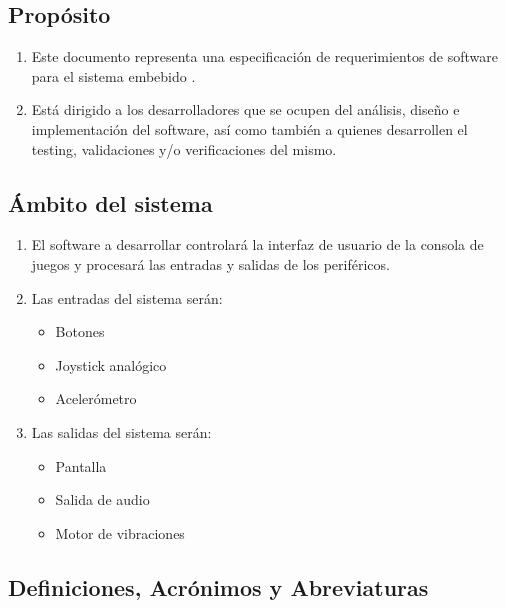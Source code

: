 \documentclass[11pt,a4paper]{article}
\begin{document}
\subsection{Propósito}
\label{sec:org434c3ef}
\begin{enumerate}
  \item Este documento representa una especificación de requerimientos de software para el sistema embebido \textit{\ttitle}. 
  \item Está dirigido a los desarrolladores que se ocupen del análisis, diseño e implementación del software, así como también a quienes desarrollen el testing, validaciones y/o verificaciones del mismo.
\end{enumerate}


\subsection{Ámbito del sistema}
\label{sec:org12e44a1}

\begin{enumerate}
  \item El software a desarrollar controlará la interfaz de usuario de la consola de juegos y procesará las entradas y salidas de los periféricos. 
  \item Las entradas del sistema serán:
  \begin{itemize}
    \item Botones
    \item Joystick analógico
    \item Acelerómetro
  \end{itemize}
  \item Las salidas del sistema serán:
  \begin{itemize}
    \item Pantalla
    \item Salida de audio
    \item Motor de vibraciones
  \end{itemize}
\end{enumerate}


\subsection{Definiciones, Acrónimos y Abreviaturas}
\label{sec:orgb158e36}
\end{document}
